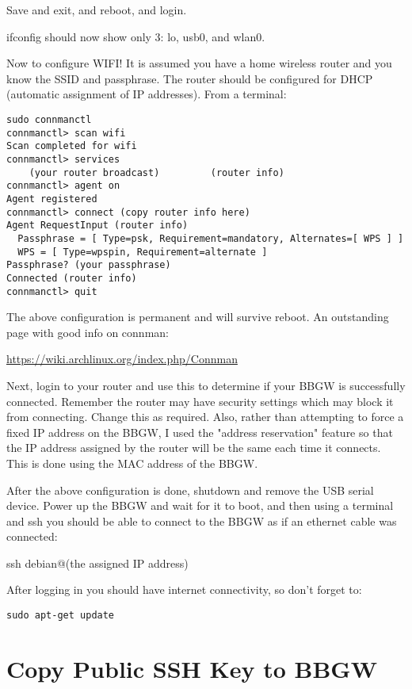Save and exit, and reboot, and login.

ifconfig should now show only 3:  lo, usb0, and wlan0.

Now to configure WIFI!  It is assumed you have a home wireless router and you 
know the SSID and passphrase.
The router should be configured for DHCP (automatic assignment of IP addresses).
From a terminal:

\begin{verbatim}
sudo connmanctl
connmanctl> scan wifi
Scan completed for wifi
connmanctl> services
    (your router broadcast)         (router info)
connmanctl> agent on
Agent registered
connmanctl> connect (copy router info here)
Agent RequestInput (router info)
  Passphrase = [ Type=psk, Requirement=mandatory, Alternates=[ WPS ] ]
  WPS = [ Type=wpspin, Requirement=alternate ]
Passphrase? (your passphrase)
Connected (router info)
connmanctl> quit
\end{verbatim}

The above configuration is permanent and will survive reboot.
An outstanding page with good info on connman:

\url{https://wiki.archlinux.org/index.php/Connman}

Next, login to your router and use this to determine if 
your BBGW is successfully connected.
Remember the router may have security settings which may block it from 
connecting.  Change this as required.
Also, rather than attempting to force a fixed IP address on the BBGW, I used 
the "address reservation" feature
so that the IP address assigned by the router will be the same each time it 
connects.  This is done using the MAC address of the BBGW.

After the above configuration is done, shutdown and remove the USB serial 
device.
Power up the BBGW and wait for it to boot, and then using a terminal and ssh 
you should be able to connect to the BBGW as if an ethernet cable was connected:

ssh debian@(the assigned IP address)

After logging in you should have internet connectivity, so don't forget to:

\begin{verbatim}
sudo apt-get update
\end{verbatim}

\section{Copy Public SSH Key to BBGW}

